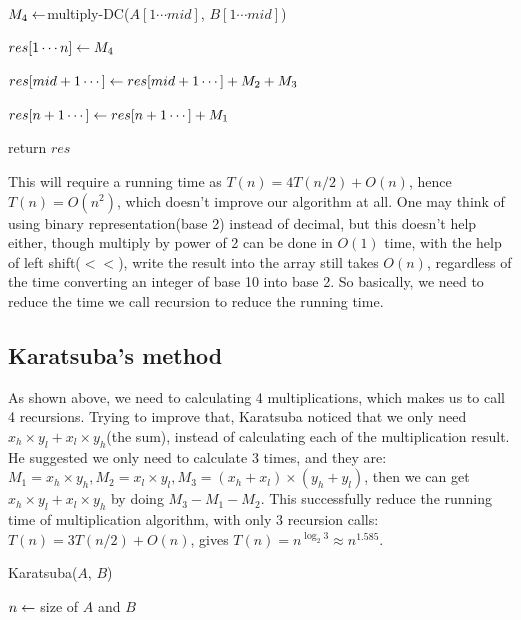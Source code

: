 \documentclass[11pt, a4paper]{COMP3711}
\begin{document}
\begin{spacing}{1.5}
\begin{algorithm}
        $M_4\leftarrow $multiply-DC($A[1\cdots mid]$, $B[1\cdots mid]$)
        \qquad {}


        $res[1\cdots n]\leftarrow M_4$

        $res[mid+1\cdots ]\leftarrow res[mid+1\cdots] + M_2+M_3$

        $res[n+1\cdots]\leftarrow res[n+1\cdots]+M_1$

        return $res$
    \end{algorithm}

    This will require a running time as $T(n)=4T(n/2)+O(n)$, 
    hence $T(n)=O(n^2)$, which doesn't improve our algorithm 
    at all. One may think of using binary representation(base 2)
    instead of decimal, but this doesn't help either, 
    though multiply by power of 2 can be done in $O(1)$ time, 
    with the help of left shift($<<$), write the result into 
    the array still takes $O(n)$, regardless of the time 
    converting an integer of base 10 into base 2. 
    So basically, we need to reduce the time we call recursion 
    to reduce the running time.

    \subsection{Karatsuba's method}

    As shown above, we need to calculating 4 multiplications,
    which makes us to call 4 recursions. Trying to improve that, 
    Karatsuba noticed that we only need $x_h\times y_l+x_l\times y_h$(the sum),
    instead of calculating each of the multiplication result.
    He suggested we only need to calculate 3 times, and they are:
    $M_1=x_h\times y_h, M_2=x_l\times y_l, M_3=(x_h+x_l)\times 
    (y_h+y_l)$, then we can get $x_h\times y_l+x_l\times y_h$ 
    by doing $M_3-M_1-M_2$. This successfully reduce the 
    running time of multiplication algorithm, with only 3 
    recursion calls:
    $T(n)=3T(n/2)+O(n)$, gives $T(n)=n^{\log_2 3}\approx n^{1.585}$.

    \begin{algorithm}
        \caption{Karatsuba($A$, $B$)}

        $n\leftarrow $ size of $A$ and $B$


\end{algorithm}
\end{spacing}
\end{document}

